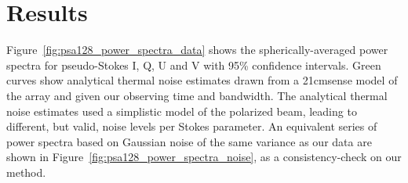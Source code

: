 \section{Results}
\label{sec:psa128_results}

Figure~\ref{fig:psa128_power_spectra_data} shows the spherically-averaged power spectra for pseudo-Stokes I, Q, U and V with 95\% confidence intervals. Green curves show analytical thermal noise estimates drawn from a {\sc 21cmsense} model of the array \citep{Pober.14, cmsense} and given our observing time and bandwidth. The analytical thermal noise estimates used a simplistic model of the polarized beam, leading to different, but valid, noise levels per Stokes parameter. An equivalent series of power spectra based on Gaussian noise of the same variance as our data are shown in Figure~\ref{fig:psa128_power_spectra_noise}, as a consistency-check on our method.

